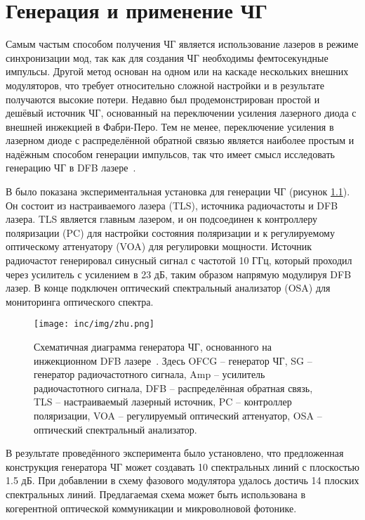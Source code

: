\chapter{Генерация и применение ЧГ}
\label{ch:research}

Самым частым способом получения ЧГ является использование лазеров в режиме синхронизации мод, так как для создания ЧГ необходимы фемтосекундные импульсы. Другой метод основан на одном или на каскаде нескольких внешних модуляторов, что требует относительно сложной настройки и в результате получаются высокие потери. Недавно был продемонстрирован простой и дешёвый источник ЧГ, основанный на переключении усиления лазерного диода с внешней инжекцией в Фабри-Перо. Тем не менее, переключение усиления в лазерном диоде с распределённой обратной связью является наиболее простым и надёжным способом генерации импульсов, так что имеет смысл исследовать генерацию ЧГ в DFB лазере~\cite{HuataoZhu2016}. 

В \cite{HuataoZhu2016} было показана экспериментальная установка для генерации ЧГ (рисунок \ref{fig:HuataoZhu}). Он состоит из настраиваемого лазера (TLS), источника радиочастоты и DFB лазера. TLS является главным лазером, и он подсоединен к контроллеру поляризации (PC) для настройки состояния поляризации и к регулируемому оптическому аттенуатору (VOA) для регулировки мощности. Источник радиочастот генерировал синусный сигнал с частотой 10 ГГц, который проходил через усилитель с усилением в 23 дБ, таким образом напрямую модулируя DFB лазер. В конце подключен оптический спектральный анализатор (OSA) для мониторинга оптического спектра.

\begin{figure}[ht]
  \centering
  \texttt{[image: inc/img/zhu.png]}
  \caption{Схематичная диаграмма генератора ЧГ, основанного на инжекционном DFB лазере~\cite{HuataoZhu2016}. Здесь OFCG \--- генератор ЧГ, SG \--- генератор радиочастотного сигнала, Amp \--- усилитель радиочастотного сигнала, DFB \--- распределённая обратная связь, TLS \--- настраиваемый лазерный источник, PC \--- контроллер поляризации, VOA \--- регулируемый оптический аттенуатор, OSA \--- оптический спектральный анализатор.}
  \label{fig:HuataoZhu}
\end{figure}

В результате проведённого эксперимента было установлено, что предложенная конструкция генератора ЧГ может создавать 10 спектральных линий с плоскостью 1.5 дБ. При добавлении в схему фазового модулятора удалось достичь 14 плоских спектральных линий. Предлагаемая схема может быть использована в когерентной оптической коммуникации и микроволновой фотонике.

